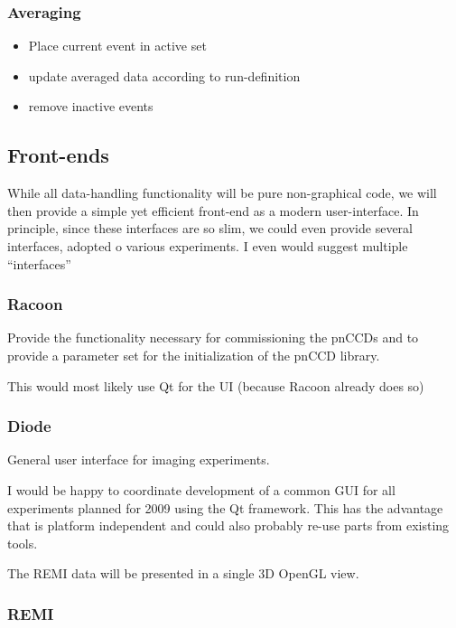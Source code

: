 \documentclass[11pt,a4paper,twoside]{article}
\begin{document}
\subsubsection{Averaging}
\label{sec:averaging}

\begin{itemize}
\item  Place current event in active set
\item  update averaged data according to run-definition
\item  remove inactive events
\end{itemize}

\subsection{Front-ends}
\label{sec:front-ends}

While all data-handling functionality will be pure non-graphical code, we will then provide a simple
yet efficient front-end as a modern user-interface. In principle, since these interfaces are so
slim, we could even provide several interfaces, adopted o various experiments. I even would suggest
multiple ``interfaces''

\subsubsection{Racoon}
\label{sec:racoon}

Provide the functionality necessary for commissioning the pnCCDs and to provide a parameter set for
the initialization of the pnCCD library.

This would most likely use Qt for the UI (because Racoon already does so)

\subsubsection{Diode}
\label{sec:diode}

General user interface for imaging experiments.

I would be happy to coordinate development of a common GUI for all experiments planned for 2009
using the Qt framework. This has the advantage that is platform independent and could also probably
re-use parts from existing tools.

The REMI data will be presented in a single 3D OpenGL view.


\subsubsection{REMI}
\label{sec:front-end-remi}
\end{document}
